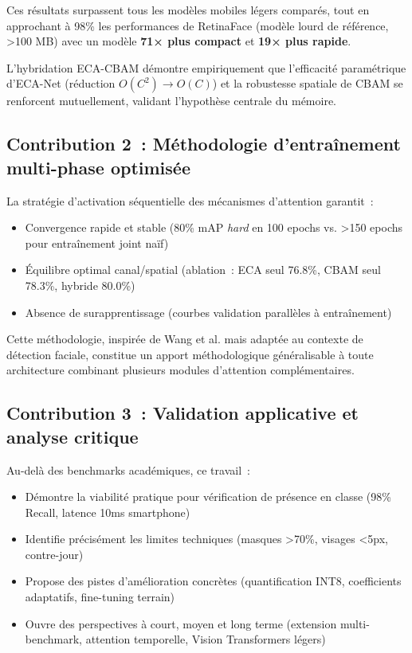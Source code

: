 \begin{onehalfspace}
\hspace{0.65 cm}Ces résultats surpassent tous les modèles mobiles légers comparés, tout en approchant à 98\% les performances de RetinaFace (modèle lourd de référence, >100 MB) avec un modèle \textbf{71× plus compact} et \textbf{19× plus rapide}.

\hspace{0.65 cm}L'hybridation ECA-CBAM démontre empiriquement que l'efficacité paramétrique d'ECA-Net \cite{Wang2020ECANet} (réduction $O(C^2) \rightarrow O(C)$) et la robustesse spatiale de CBAM \cite{Woo2018CBAM} se renforcent mutuellement, validant l'hypothèse centrale du mémoire.

\subsection*{Contribution 2~: Méthodologie d'entraînement multi-phase optimisée}

\hspace{0.65 cm}La stratégie d'activation séquentielle des mécanismes d'attention garantit~:
\begin{itemize}
\item Convergence rapide et stable (80\% mAP \textit{hard} en 100 epochs vs. >150 epochs pour entraînement joint naïf)
\item Équilibre optimal canal/spatial (ablation~: ECA seul 76.8\%, CBAM seul 78.3\%, hybride 80.0\%)
\item Absence de surapprentissage (courbes validation parallèles à entraînement)
\end{itemize}

\hspace{0.65 cm}Cette méthodologie, inspirée de Wang et al. \cite{Wang2024ECACBAM} mais adaptée au contexte de détection faciale, constitue un apport méthodologique généralisable à toute architecture combinant plusieurs modules d'attention complémentaires.

\subsection*{Contribution 3~: Validation applicative et analyse critique}

\hspace{0.65 cm}Au-delà des benchmarks académiques, ce travail~:
\begin{itemize}
\item Démontre la viabilité pratique pour vérification de présence en classe (98\% Recall, latence 10ms smartphone)
\item Identifie précisément les limites techniques (masques >70\%, visages <5px, contre-jour)
\item Propose des pistes d'amélioration concrètes (quantification INT8, coefficients adaptatifs, fine-tuning terrain)
\item Ouvre des perspectives à court, moyen et long terme (extension multi-benchmark, attention temporelle, Vision Transformers légers)
\end{itemize}


\end{onehalfspace}
